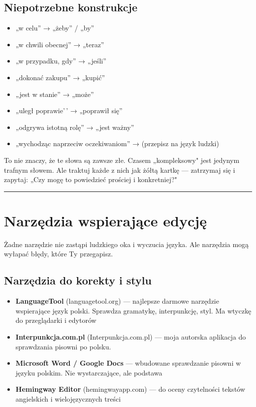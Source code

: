 \documentclass[
  12pt,
  a4paper,
  twoside,
  openright,
  12pt,
  DIV=12,
  BCOR=12mm]{scrbook}
\providecommand{\tightlist}{%
  \setlength{\itemsep}{0pt}\setlength{\parskip}{0pt}}\usepackage{longtable,booktabs,array}
\newcommand{\decoline}{%
  \begin{center}
    \textcolor{bordergray}{\rule{0.3\textwidth}{0.5pt}}
  \end{center}
}
\begin{document}
\subsection{Niepotrzebne konstrukcje}\label{niepotrzebne-konstrukcje}

\begin{itemize}
\tightlist
\item
  „w celu'' → „żeby'' / „by''
\item
  „w chwili obecnej'' → „teraz''
\item
  „w przypadku, gdy'' → „jeśli''
\item
  „dokonać zakupu'' → „kupić''
\item
  „jest w stanie'' → „może''
\item
  „uległ poprawie'\,' → „poprawił się''
\item
  „odgrywa istotną rolę'' → „jest ważny''
\item
  „wychodząc naprzeciw oczekiwaniom'' → (przepisz na język ludzki)
\end{itemize}

\begin{uwaga}
To nie znaczy, że te słowa są zawsze złe. Czasem „kompleksowy" jest jedynym trafnym słowem. Ale traktuj każde z nich jak żółtą kartkę --- zatrzymaj się i zapytaj: „Czy mogę to powiedzieć prościej i konkretniej?"
\end{uwaga}

\decoline

\section{Narzędzia wspierające
edycję}\label{narzux119dzia-wspierajux105ce-edycjux119}

Żadne narzędzie nie zastąpi ludzkiego oka i wyczucia języka. Ale
narzędzia mogą wyłapać błędy, które Ty przegapisz.

\subsection{Narzędzia do korekty i
stylu}\label{narzux119dzia-do-korekty-i-stylu}

\begin{itemize}
\tightlist
\item
  \textbf{LanguageTool} (languagetool.org) --- najlepsze darmowe
  narzędzie wspierające język polski. Sprawdza gramatykę, interpunkcję,
  styl. Ma wtyczkę do przeglądarki i edytorów
\item
  \textbf{Interpunkcja.com.pl} (Interpunkcja.com.pl) --- moja autorska
  aplikacja do sprawdzania pisowni po polsku.
\item
  \textbf{Microsoft Word / Google Docs} --- wbudowane sprawdzanie
  pisowni w języku polskim. Nie wystarczające, ale podstawa
\item
  \textbf{Hemingway Editor} (hemingwayapp.com) --- do oceny czytelności
  tekstów angielskich i wielojęzycznych treści
\end{itemize}
\end{document}
